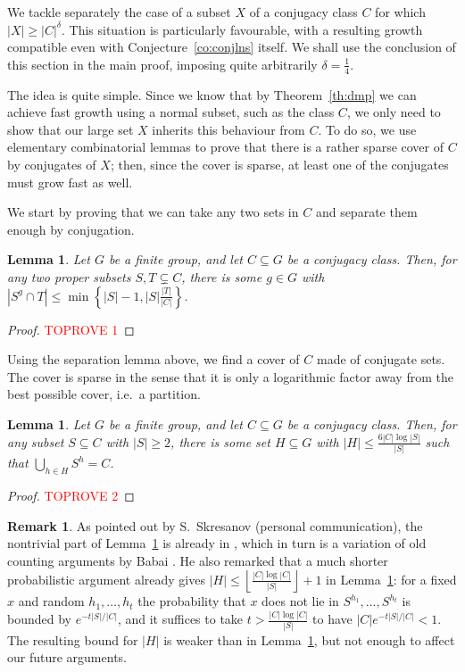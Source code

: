 \documentclass[a4paper]{article}
\newtheorem{lemma}[proposition]{Lemma}
\theoremstyle{definition}
\newtheorem{remark}[proposition]{Remark}
\numberwithin{equation}{section}
\begin{document}
We tackle separately the case of a subset $X$ of a conjugacy class $C$ for which $|X|\geq|C|^{\delta}$. This situation is particularly favourable, with a resulting growth compatible even with Conjecture~\ref{co:conjlns} itself. We shall use the conclusion of this section in the main proof, imposing quite arbitrarily $\delta=\frac{1}{4}$.

The idea is quite simple. Since we know that by Theorem~\ref{th:dmp} we can achieve fast growth using a normal subset, such as the class $C$, we only need to show that our large set $X$ inherits this behaviour from $C$. To do so, we use elementary combinatorial lemmas to prove that there is a rather sparse cover of $C$ by conjugates of $X$; then, since the cover is sparse, at least one of the conjugates must grow fast as well.

We start by proving that we can take any two sets in $C$ and separate them enough by conjugation.

\begin{lemma}\label{le:piececl}
Let $G$ be a finite group, and let $C\subseteq G$ be a conjugacy class. Then, for any two proper subsets $S,T\subsetneq C$, there is some $g\in G$ with $|S^{g}\cap T|\leq\min\left\{|S|-1,|S|\frac{|T|}{|C|}\right\}$.
\end{lemma}

\begin{proof}\textcolor{red}{TOPROVE 1}\end{proof}

Using the separation lemma above, we find a cover of $C$ made of conjugate sets. The cover is sparse in the sense that it is only a logarithmic factor away from the best possible cover, i.e.\ a partition.

\begin{lemma}\label{le:covercl}
Let $G$ be a finite group, and let $C\subseteq G$ be a conjugacy class. Then, for any subset $S\subseteq C$ with $|S|\geq 2$, there is some set $H\subseteq G$ with $|H|\leq\frac{6|C|\log|S|}{|S|}$ such that $\bigcup_{h\in H}S^{h}=C$.
\end{lemma}

\begin{proof}\textcolor{red}{TOPROVE 2}\end{proof}

\begin{remark}
As pointed out by S.~Skresanov (personal communication), the nontrivial part of Lemma~\ref{le:piececl} is already in \cite[Lemma 2]{DeV23}, which in turn is a variation of old counting arguments by Babai \cite{Bab80c}. He also remarked that a much shorter probabilistic argument already gives $|H|\leq\left\lfloor\frac{|C|\log|C|}{|S|}\right\rfloor+1$ in Lemma~\ref{le:covercl}: for a fixed $x$ and random $h_{1},\ldots,h_{t}$ the probability that $x$ does not lie in $S^{h_{1}},\ldots,S^{h_{t}}$ is bounded by $e^{-t|S|/|C|}$, and it suffices to take $t>\frac{|C|\log|C|}{|S|}$ to have $|C|e^{-t|S|/|C|}<1$. The resulting bound for $|H|$ is weaker than in Lemma~\ref{le:covercl}, but not enough to affect our future arguments.
\end{remark}
\end{document}
